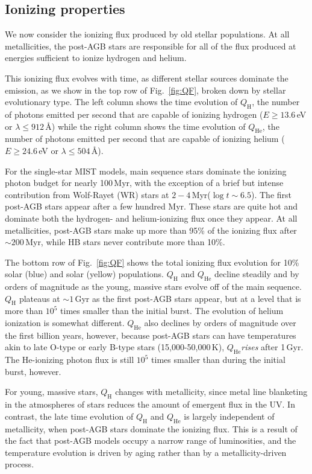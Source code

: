 \documentclass[preprint2]{aastex62}
\newcommand{\ang}{\ensuremath{\mbox{\AA}}\xspace}
\newcommand{\QH}{\ensuremath{Q_{\mathrm{H}}}\xspace}
\newcommand{\QHe}{\ensuremath{Q_{\mathrm{He}}}\xspace}
\newcommand{\Myr}{$\,$Myr\xspace}
\newcommand{\Gyr}{$\,$Gyr\xspace}
\begin{document}
\subsection{Ionizing properties}\label{sec:stars:ion}

We now consider the ionizing flux produced by old stellar populations. At all metallicities, the post-AGB stars are responsible for all of the flux produced at energies sufficient to ionize hydrogen and helium. 

This ionizing flux evolves with time, as different stellar sources dominate the emission, as we show in the top row of Fig.~\ref{fig:QF}, broken down by stellar evolutionary type. The left column shows the time evolution of \QH, the number of photons emitted per second that are capable of ionizing hydrogen ($E\geq13.6\,$eV or $\lambda \leq 912\,$\ang) while the right column shows the time evolution of \QHe, the number of photons emitted per second that are capable of ionizing helium ($E\geq24.6\,$eV or $\lambda \leq 504\,$\ang).

For the single-star MIST models, main sequence stars dominate the ionizing photon budget for nearly 100\Myr, with the exception of a brief but intense contribution from Wolf-Rayet (WR) stars at $2-4$\Myr ($\log t\sim6.5$). The first post-AGB stars appear after a few hundred Myr. These stars are quite hot and dominate both the hydrogen- and helium-ionizing flux once they appear. At all metallicities, post-AGB stars make up more than 95\% of the ionizing flux after $\sim200$\Myr, while HB stars never contribute more than 10\%.

The bottom row of Fig.~\ref{fig:QF} shows the total ionizing flux evolution for 10\% solar (blue) and solar (yellow) populations. \QH and \QHe decline steadily and by orders of magnitude as the young, massive stars evolve off of the main sequence. \QH plateaus at ${\sim}1$\Gyr as the first post-AGB stars appear, but at a level that is more than $10^5$ times smaller than the initial burst. The evolution of helium ionization is somewhat different. \QHe also declines by orders of magnitude over the first billion years, however, because post-AGB stars can have temperatures akin to late O-type or early B-type stars (15,000-50,000\,K), \QHe \emph{rises} after 1\Gyr. The He-ionizing photon flux is still $10^5$ times smaller than during the initial burst, however.

For young, massive stars, \QH changes with metallicity, since metal line blanketing in the atmospheres of stars reduces the amount of emergent flux in the UV. In contrast, the late time evolution of \QH and \QHe is largely independent of metallicity, when post-AGB stars dominate the ionizing flux. This is a result of the fact that post-AGB models occupy a narrow range of luminosities, and the temperature evolution is driven by aging rather than by a metallicity-driven process.
\end{document}
